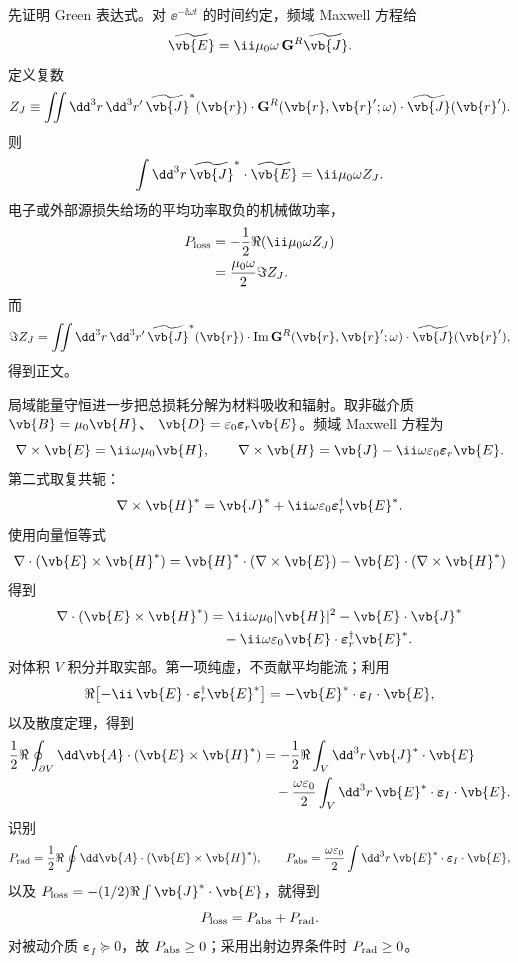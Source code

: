 \begin{derivation}[源损失中的吸收与辐射通道]
先证明 Green 表达式。对 $\ee^{-\ii\omega t}$ 的时间约定，频域 Maxwell 方程给
\[
\widetilde{\vb{E}}
=\ii\mu_0\omega\,\mathbf G^R\widetilde{\vb{J}}.
\]
定义复数
\[
Z_J
\equiv
\iint\dd^3r\,\dd^3r'\,
\widetilde{\vb{J}}^{*}(\vb{r})\cdot
\mathbf G^R(\vb{r},\vb{r}';\omega)
\cdot\widetilde{\vb{J}}(\vb{r}').
\]
则
\[
\int\dd^3r\,\widetilde{\vb{J}}^{*}\cdot\widetilde{\vb{E}}
=\ii\mu_0\omega Z_J.
\]
电子或外部源损失给场的平均功率取负的机械做功率，
\begin{align*}
P_{\rm loss}
&=-\frac12\Re(\ii\mu_0\omega Z_J)\\
&=\frac{\mu_0\omega}{2}\Im Z_J.
\end{align*}
而
\[
\Im Z_J
=\iint\dd^3r\,\dd^3r'\,
\widetilde{\vb{J}}^{*}(\vb{r})\cdot
\operatorname{Im}\mathbf G^R(\vb{r},\vb{r}';\omega)
\cdot\widetilde{\vb{J}}(\vb{r}'),
\]
得到正文。

局域能量守恒进一步把总损耗分解为材料吸收和辐射。取非磁介质
$\vb{B}=\mu_0\vb{H}$、
$\vb{D}=\varepsilon_0\boldsymbol\varepsilon_r\vb{E}$。频域 Maxwell 方程为
\[
\nabla\times\vb{E}=\ii\omega\mu_0\vb{H},
\qquad
\nabla\times\vb{H}=\vb{J}-\ii\omega\varepsilon_0
\boldsymbol\varepsilon_r\vb{E}.
\]
第二式取复共轭：
\[
\nabla\times\vb{H}^*
=\vb{J}^*+\ii\omega\varepsilon_0
\boldsymbol\varepsilon_r^\dagger\vb{E}^*.
\]
使用向量恒等式
\[
\nabla\cdot(\vb{E}\times\vb{H}^*)
=\vb{H}^*\cdot(\nabla\times\vb{E})
-\vb{E}\cdot(\nabla\times\vb{H}^*)
\]
得到
\begin{align*}
\nabla\cdot(\vb{E}\times\vb{H}^*)
&=\ii\omega\mu_0|\vb{H}|^2
-\vb{E}\cdot\vb{J}^*\\
&\quad
-\ii\omega\varepsilon_0
\vb{E}\cdot\boldsymbol\varepsilon_r^\dagger\vb{E}^*.
\end{align*}
对体积 $V$ 积分并取实部。第一项纯虚，不贡献平均能流；利用
\[
\Re\!\left[-\ii\,
\vb{E}\cdot\boldsymbol\varepsilon_r^\dagger\vb{E}^*\right]
=-\vb{E}^*\cdot\boldsymbol\varepsilon_I\cdot\vb{E},
\]
以及散度定理，得到
\begin{align*}
\frac12\Re\oint_{\partial V}\dd\vb{A}\cdot
(\vb{E}\times\vb{H}^*)
&=-\frac12\Re\int_V\dd^3r\,\vb{J}^*\cdot\vb{E}\\
&\quad
-\frac{\omega\varepsilon_0}{2}
\int_V\dd^3r\,
\vb{E}^*\cdot\boldsymbol\varepsilon_I\cdot\vb{E}.
\end{align*}
识别
\[
P_{\rm rad}
=\frac12\Re\oint\dd\vb{A}\cdot(\vb{E}\times\vb{H}^*),
\qquad
P_{\rm abs}
=\frac{\omega\varepsilon_0}{2}\int\dd^3r\,
\vb{E}^*\cdot\boldsymbol\varepsilon_I\cdot\vb{E},
\]
以及
$P_{\rm loss}=-(1/2)\Re\int\vb{J}^*\cdot\vb{E}$，就得到
\[
{P_{\rm loss}=P_{\rm abs}+P_{\rm rad}.}
\]
对被动介质 $\boldsymbol\varepsilon_I\succeq0$，故 $P_{\rm abs}\ge0$；采用出射边界条件时 $P_{\rm rad}\ge0$。
\end{derivation}

